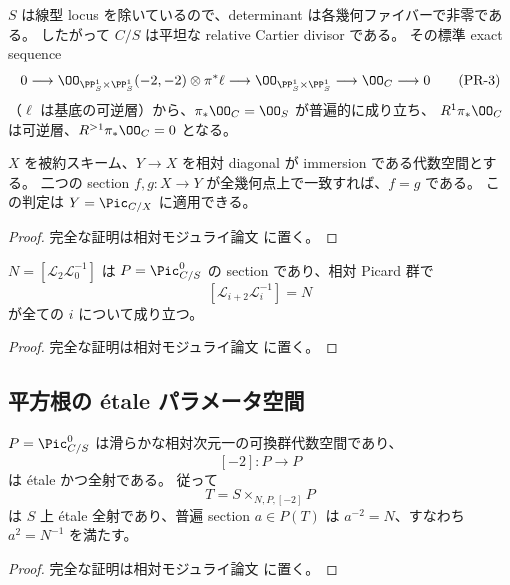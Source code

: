 $S$ は線型 locus を除いているので、determinant は各幾何ファイバーで非零である。
したがって $C/S$ は平坦な relative Cartier divisor である。
その標準 exact sequence
\[
 0\longrightarrow\OO_{\PP^1_S\times\PP^1_S}(-2,-2)\otimes\pi^*\ell
 \longrightarrow\OO_{\PP^1_S\times\PP^1_S}
 \longrightarrow\OO_C\longrightarrow0
 \tag{PR-3}\label{eq:curve-sequence}
\]
（$\ell$ は基底の可逆層）から、$\pi_*\OO_C=\OO_S$ が普遍的に成り立ち、
$R^1\pi_*\OO_C$ は可逆層、$R^{>1}\pi_*\OO_C=0$ となる。

\begin{lemma}\label{lem:reduced-equalizer}
$X$ を被約スキーム、$Y\to X$ を相対 diagonal が immersion である代数空間とする。
二つの section $f,g:X\to Y$ が全幾何点上で一致すれば、$f=g$ である。
この判定は $Y=\Pic_{C/X}$ に適用できる。
\end{lemma}

\begin{proof}
完全な証明は相対モジュライ論文 \cite[\texttt{relative_picard_roots}]{QuadricModuli2026} に置く。
\end{proof}

\begin{lemma}\label{lem:relative-helix-difference}
$N=[\mathcal L_2\mathcal L_0^{-1}]$ は $P=\Pic^0_{C/S}$ の section であり、相対 Picard 群で
\[
 [\mathcal L_{i+2}\mathcal L_i^{-1}]=N
 \tag{PR-4}\label{eq:helix-difference}
\]
が全ての $i$ について成り立つ。
\end{lemma}

\begin{proof}
完全な証明は相対モジュライ論文 \cite[\texttt{relative_picard_roots}]{QuadricModuli2026} に置く。
\end{proof}

\subsection{平方根の étale パラメータ空間}

\begin{lemma}\label{lem:picard-halves}
$P=\Pic^0_{C/S}$ は滑らかな相対次元一の可換群代数空間であり、
\[
 [-2]:P\longrightarrow P
\]
は étale かつ全射である。
従って
\[
 T=S\mathbin{\times}_{N,P,[-2]}P
 \tag{PR-5}\label{eq:T}
\]
は $S$ 上 étale 全射であり、普遍 section $a\in P(T)$ は
$a^{-2}=N$、すなわち $a^2=N^{-1}$ を満たす。
\end{lemma}

\begin{proof}
完全な証明は相対モジュライ論文 \cite[\texttt{relative_picard_roots}]{QuadricModuli2026} に置く。
\end{proof}

